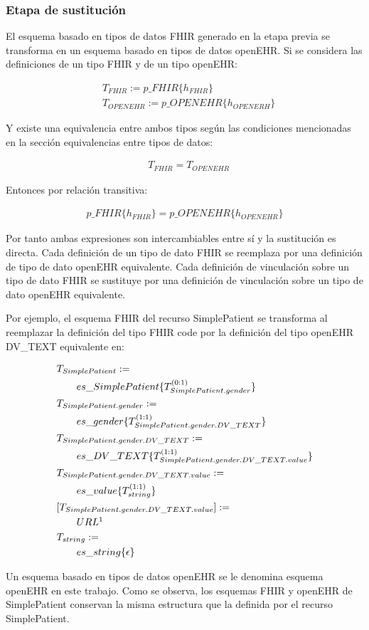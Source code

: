 \subsubsection{Etapa de sustitución}

El esquema basado en tipos de datos FHIR generado en la etapa previa se transforma en un esquema basado en tipos de datos openEHR. Si se considera las definiciones de un tipo FHIR y de un tipo openEHR:

\begin{align*}
&T_{FHIR}:=p\_FHIR\{h_{FHIR}\} \\
&T_{OPENEHR}:=p\_OPENEHR\{h_{OPENERH}\}
\end{align*}

\noindent
Y existe una equivalencia entre ambos tipos según las condiciones mencionadas en la sección equivalencias entre tipos de datos:

\begin{align*}
&T_{FHIR} = T_{OPENEHR}
\end{align*}

\noindent
Entonces por relación transitiva:

\begin{align*}
p\_FHIR\{h_{FHIR}\} = p\_OPENEHR\{h_{OPENEHR}\}
\end{align*}

\noindent
Por tanto ambas expresiones son intercambiables entre sí y la sustitución es directa. Cada definición de un tipo de dato FHIR se reemplaza por una definición de tipo de dato openEHR equivalente. Cada definición de vinculación sobre un tipo de dato FHIR se sustituye por una definición de vinculación sobre un tipo de dato openEHR equivalente.

Por ejemplo, el esquema FHIR del recurso SimplePatient se transforma al reemplazar la definición del tipo FHIR code por la definición del tipo openEHR DV\_TEXT equivalente en:

\begin{align*}
&T_{SimplePatient}:= \\
&\qquad es\_SimplePatient\{T_{SimplePatient.gender}^{(0:1)}\} \\
&T_{SimplePatient.gender}:= \\
&\qquad es\_gender\{T_{SimplePatient.gender.DV\_TEXT}^{(1:1)}\} \\
&T_{SimplePatient.gender.DV\_TEXT}:= \\
&\qquad es\_DV\_TEXT\{T_{SimplePatient.gender.DV\_TEXT.value}^{(1:1)}\} \\
&T_{SimplePatient.gender.DV\_TEXT.value}:= \\
&\qquad es\_value\{T_{string}^{(1:1)}\} \\
&[T_{SimplePatient.gender.DV\_TEXT.value}] := \\
&\qquad URL \footnotemark[1] \\
&T_{string}:= \\
&\qquad es\_string\{\epsilon\} \\
\end{align*}

Un esquema basado en tipos de datos openEHR se le denomina esquema openEHR en este trabajo. Como se observa, los esquemas FHIR y openEHR de SimplePatient conservan la misma estructura que la definida por el recurso SimplePatient.
